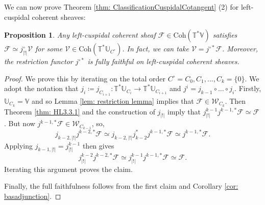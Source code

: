 \documentclass{amsart}
\newtheorem{proposition}[theorem]{Proposition}
\theoremstyle{definition}
\theoremstyle{remark}
\numberwithin{equation}{section}
\newcommand{\U}{\mathbb{U}}
\newcommand{\mc}{\mathcal}
\newcommand{\Coh}{\mathrm{Coh}}
\newcommand{\V}{\mathbb{V}}
\newcommand{\T}{\mathbb{T}}
\newcommand{\ush}{\lvert ! \rvert}
\begin{document}
We can now prove Theorem \ref{thm: ClassificationCuspidalCotangent} (2) for left-cuspidal coherent sheaves:
\begin{proposition}{\label{prop: cuspextopen}}
    Any left-cuspidal coherent sheaf $\mc{F} \in \Coh(\T^{\ast}\V)$ satisfies $\mc{F} \simeq j^{\circ}_{\ush} \mc{V}$ for some $\mc{V} \in \Coh(\T^{\ast}\U_{C^{\circ}})$. In fact, we can take $\mc{V} = j^{\circ \ast} \mc{F}$. Moreover, the restriction functor $j^{\circ \ast}$ is fully faithful on left-cuspidal coherent sheaves.
\end{proposition}
\begin{proof}
    
 We prove this by iterating on the total order $C^{\circ}=C_0, C_1, ..., C_k=\{0\}$. We adopt the notation that $j_i\coloneq j_{C_{i+1}}: \T^{\ast}\U_{C_i} \rightarrow \T^{\ast}\U_{C_{i+1}}$ and $j^i = j_{k-1}\circ \dots \circ j_i$. Firstly, $\U_{C_k}=\V$ and so Lemma \ref{lem: restriction lemma} implies that $\mc{F} \in \mc{W}_{C_k}$. Then Theorem \ref{thm: HL3.3.1} and the construction of $j_{\ush}$ imply that $j^{k-1}_{\ush}j^{k-1, \ast}\mc{F} \simeq \mc{F}$. But now $j^{k-1, \ast} \mc{F} \in \mc{W}_{C_{k-1}}$, so, 
\begin{equation*}
    j_{k-2, \ush} j^{k-2, \ast} \mc{F}\simeq j_{k-2, \ush}j^{\ast}_{k-2} j^{k-1, \ast} \mc{F}  \simeq j^{k-1, \ast} \mc{F}.
\end{equation*}
Applying $j_{k-1, \ush}=j^{k-1}_{\ush}$ then gives
\begin{equation*}
    j^{k-2}_{\ush}j^{k-2, \ast}\mc{F} \simeq j^{k-1}_{\ush}j^{k-1, \ast}\mc{F} \simeq \mc{F}.
\end{equation*}
Iterating this argument proves the claim.

Finally, the full faithfulness follows from the first claim and Corollary \ref{cor: basadjunction}.
\end{proof}
\end{document}

